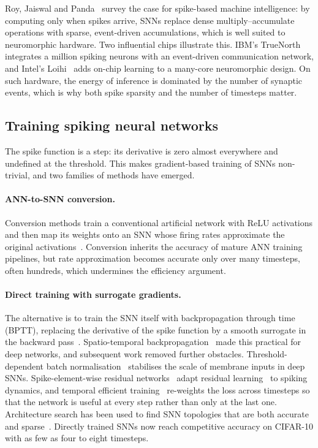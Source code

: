 Roy, Jaiswal and Panda~\cite{roy2019towards} survey the case for spike-based machine intelligence: by computing only when spikes arrive, SNNs replace dense multiply--accumulate operations with sparse, event-driven accumulations, which is well suited to neuromorphic hardware. Two influential chips illustrate this. IBM's TrueNorth~\cite{merolla2014million} integrates a million spiking neurons with an event-driven communication network, and Intel's Loihi~\cite{davies2018loihi} adds on-chip learning to a many-core neuromorphic design. On such hardware, the energy of inference is dominated by the number of synaptic events, which is why both spike sparsity and the number of timesteps matter.

\subsection{Training spiking neural networks}

The spike function is a step: its derivative is zero almost everywhere and undefined at the threshold. This makes gradient-based training of SNNs non-trivial, and two families of methods have emerged.

\paragraph{ANN-to-SNN conversion.} Conversion methods train a conventional artificial network with ReLU activations and then map its weights onto an SNN whose firing rates approximate the original activations~\cite{rueckauer2017conversion}. Conversion inherits the accuracy of mature ANN training pipelines, but rate approximation becomes accurate only over many timesteps, often hundreds, which undermines the efficiency argument.

\paragraph{Direct training with surrogate gradients.} The alternative is to train the SNN itself with backpropagation through time (BPTT), replacing the derivative of the spike function by a smooth surrogate in the backward pass~\cite{neftci2019surrogate}. Spatio-temporal backpropagation~\cite{wu2018spatio} made this practical for deep networks, and subsequent work removed further obstacles. Threshold-dependent batch normalisation~\cite{zheng2021going} stabilises the scale of membrane inputs in deep SNNs. Spike-element-wise residual networks~\cite{fang2021deep} adapt residual learning~\cite{he2016deep} to spiking dynamics, and temporal efficient training~\cite{deng2022temporal} re-weights the loss across timesteps so that the network is useful at every step rather than only at the last one. Architecture search has been used to find SNN topologies that are both accurate and sparse~\cite{na2022autosnn}. Directly trained SNNs now reach competitive accuracy on CIFAR-10 with as few as four to eight timesteps.

